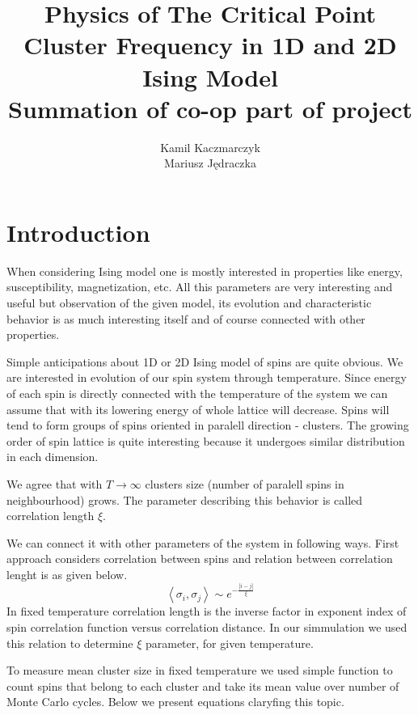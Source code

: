 \documentclass[a4paper,12pt,titlepage]{article}
\title{Physics of The Critical Point\\\normalsize Cluster Frequency in 1D and 2D Ising Model\\\small Summation of co-op part of project}
\author{Kamil Kaczmarczyk \\ Mariusz Jędraczka}
\begin{document}
\maketitle
\newpage
  \section{Introduction}
  When considering Ising model one is mostly interested in properties like energy, susceptibility, magnetization, etc. All this 
  parameters are very interesting and useful but observation of the given model, its evolution and characteristic behavior is as much
  interesting itself and of course connected with other properties.
  
  Simple anticipations about 1D or 2D Ising model of spins are quite obvious. We are interested in evolution of our spin system through
  temperature. Since energy of each spin is directly connected with the temperature of the system we can assume that with its lowering
  energy of whole lattice will decrease. Spins will tend to form groups of spins oriented in paralell direction - clusters. The growing
  order of spin lattice is quite interesting because it undergoes similar distribution in each dimension.
  
  We agree that with $T \rightarrow \infty$ clusters size (number of paralell spins in neighbourhood) grows. The parameter describing
  this behavior is called correlation length $\xi$.
  
  
  We can connect it with other parameters of the system in following ways. First approach considers correlation between spins and relation between correlation lenght is as given
  below.
  \begin{equation}
   \left<\sigma_i,\sigma_j\right>\sim e^{-\frac{|i-j|}{\xi}}
  \end{equation}
  In fixed temperature correlation length is the inverse factor in exponent index of spin correlation function versus correlation distance.
  In our simmulation we used this relation to determine $\xi$ parameter, for given temperature.
  
  To measure mean cluster size in fixed temperature we used simple function to count spins that belong to each cluster and take its mean
  value over number of Monte Carlo cycles. Below we present equations claryfing this topic.
  
\end{document}
